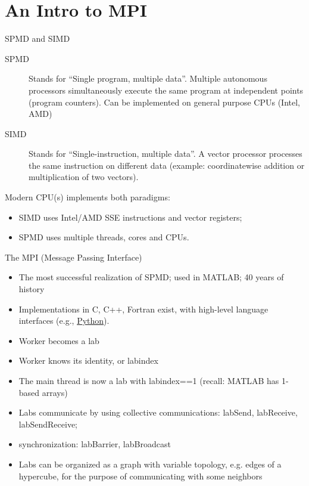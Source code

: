 \documentclass[pdflatex,colorlinks,landscape]{beamer}
\renewcommand\emph[1]{{\color{magenta}#1}}
\begin{document}
\section{An Intro to MPI}
\begin{frame}{SPMD and SIMD}
  \begin{description}
  \item[SPMD] Stands for ``Single program, multiple data''. \emph{Multiple
    autonomous processors} simultaneously execute the same program at
    independent points (program counters). Can be implemented on general
    purpose CPUs (Intel, AMD)
  \item[SIMD] Stands for ``Single-instruction, multiple data''.  A
    \emph{vector processor} processes the same instruction on different
    data (example: coordinatewise addition or multiplication of two
    vectors).
  \end{description}
  Modern CPU(s) implements \emph{both paradigms}:
  \begin{itemize}
  \item SIMD uses Intel/AMD \emph{SSE instructions} and \emph{vector registers};
  \item SPMD uses multiple \emph{threads}, \emph{cores} and CPUs.
  \end{itemize}
\end{frame}

\begin{frame}{The MPI (Message Passing Interface)}
  \begin{itemize}
  \item The most successful realization of SPMD; used in MATLAB; 40 years of history 
  \item Implementations in C, C++, Fortran exist, with high-level
    language interfaces
    (e.g., \href{https://mpi4py.readthedocs.io/en/stable/}{Python}).
  \item Worker becomes a \emph{lab}
  \item Worker knows its identity, or \emph{labindex}
  \item The main thread is now a lab with \emph{labindex==1} (recall: MATLAB has 1-based arrays)
  \item Labs communicate by using \emph{collective communications}: labSend, labReceive, labSendReceive;
  \item synchronization: labBarrier, labBroadcast
  \item Labs can be organized as a graph with variable topology, e.g. edges of a hypercube, for
    the purpose of communicating with some neighbors
  \end{itemize}
\end{frame}
\end{document}
